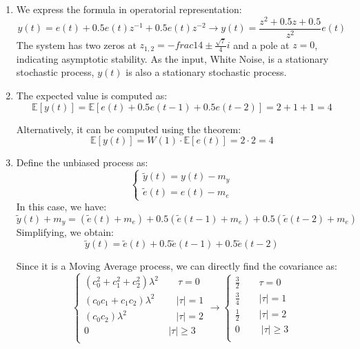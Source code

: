 \begin{enumerate}
    \item We express the formula in operatorial representation:
        \[y(t)=e(t)+0.5e(t)z^{-1}+0.5e(t)z^{-2}\rightarrow y(t)=\dfrac{z^2+0.5z+0.5}{z^2}e(t)\]
        The system has two zeros at $z_{1,2}=-frac{1}{4}\pm \frac{\sqrt{7}}{4}i$  and a pole at $z=0$, indicating asymptotic stability.
        As the input, White Noise, is a stationary stochastic process, $y(t)$ is also a stationary stochastic process.
    \item The expected value is computed as:
        \[\mathbb{E}\left[ y(t) \right]=\mathbb{E}\left[ e(t)+0.5e(t-1)+0.5e(t-2) \right]=2+1+1=4\]

        Alternatively, it can be computed using the theorem: 
        \[\mathbb{E}\left[ y(t) \right]=W(1)\cdot\mathbb{E}\left[ e(t) \right]=2\cdot 2=4\]
    \item Define the unbiased process as: 
        \[\begin{cases}
            \tilde{y}(t)=y(t)-m_y \\
            \tilde{e}(t)=e(t)-m_e
        \end{cases}\]
        In this case, we have: 
        \[\tilde{y}(t)+m_y=\left(\tilde{e}(t)+m_e\right)+0.5\left(\tilde{e}(t-1)+m_e\right)+0.5\left(\tilde{e}(t-2)+m_e\right)\]
        Simplifying, we obtain: 
        \[\tilde{y}(t)=\tilde{e}(t)+0.5\tilde{e}(t-1)+0.5\tilde{e}(t-2)\]

        Since it is a Moving Average process, we can directly find the covariance as: 
        \[\begin{cases}
            \left(c_0^2+c_1^2+c_2^2\right)\lambda^2 \qquad \tau=0 \\
            \left(c_0c_1+c_1c_2\right)\lambda^2 \qquad\: \left\lvert \tau\right\rvert =1 \\
            \left(c_0c_2\right)\lambda^2 \qquad\qquad\:\:\:\:\: \left\lvert \tau\right\rvert =2 \\
            0 \qquad\qquad\qquad\qquad\: \left\lvert \tau\right\rvert \geq 3 \\
        \end{cases} \rightarrow \begin{cases}
            \frac{3}{2} \qquad \tau=0 \\
            \frac{3}{4} \qquad \left\lvert \tau\right\rvert =1 \\
            \frac{1}{2} \qquad \left\lvert \tau\right\rvert =2 \\
            0 \:\qquad \left\lvert \tau\right\rvert \geq 3 \\
        \end{cases}\]
\end{enumerate}